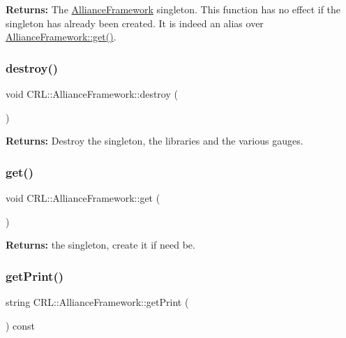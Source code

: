 {\bfseries Returns\+:} The \hyperlink{classCRL_1_1AllianceFramework}{Alliance\+Framework} singleton. This function has no effect if the singleton has already been created. It is indeed an alias over \hyperlink{classCRL_1_1AllianceFramework_a976479af696a86c998c10d9d2604839d}{Alliance\+Framework\+::get()}. \mbox{\label{classCRL_1_1AllianceFramework_a7877a201b66f2ade7621810acd842f47}} 
\subsubsection{\texorpdfstring{destroy()}{destroy()}}
{\footnotesize\ttfamily void C\+R\+L\+::\+Alliance\+Framework\+::destroy (\begin{DoxyParamCaption}{ }\end{DoxyParamCaption})}

{\bfseries Returns\+:} Destroy the singleton, the libraries and the various gauges. \mbox{\label{classCRL_1_1AllianceFramework_a976479af696a86c998c10d9d2604839d}} 
\subsubsection{\texorpdfstring{get()}{get()}}
{\footnotesize\ttfamily void C\+R\+L\+::\+Alliance\+Framework\+::get (\begin{DoxyParamCaption}{ }\end{DoxyParamCaption})\hspace{0.3cm}{\ttfamily [static]}}

{\bfseries Returns\+:} the singleton, create it if need be. \mbox{\label{classCRL_1_1AllianceFramework_ab142ba712b0e6388e45bb8d2fa05d93e}} 
\subsubsection{\texorpdfstring{get\+Print()}{getPrint()}}
{\footnotesize\ttfamily string C\+R\+L\+::\+Alliance\+Framework\+::get\+Print (\begin{DoxyParamCaption}{ }\end{DoxyParamCaption}) const}

